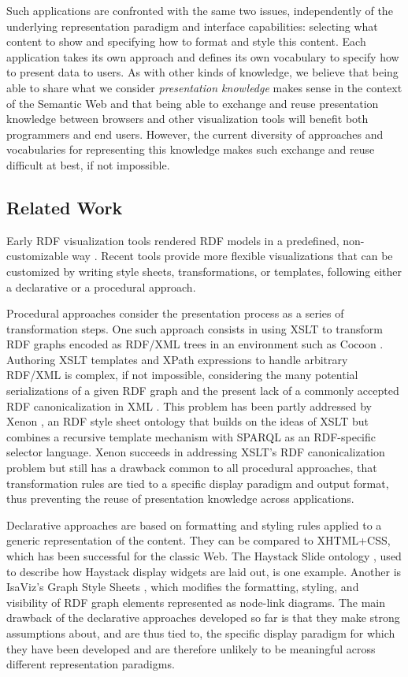 Such applications are confronted with the same two issues, independently of the underlying representation paradigm and interface capabilities: selecting what content to show and specifying how to format and style this content. Each application takes its own approach and defines its own vocabulary to specify how to present data to users. As with other kinds of knowledge, we believe that being able to share what we consider {\em presentation knowledge} makes sense in the context of the Semantic Web and that being able to exchange and reuse presentation knowledge between browsers and other visualization tools will benefit both programmers and end users. However, the current diversity of approaches and vocabularies for representing this knowledge makes such exchange and reuse difficult at best, if not impossible.

\subsection{Related Work}

Early RDF visualization tools rendered RDF models in a predefined, non-custo\-mizable way \cite{Steer03}. Recent tools provide more flexible visualizations that can be customized by writing style sheets, transformations, or templates, following either a declarative or a procedural approach.

Procedural approaches consider the presentation process as a series of transformation steps. One such approach consists in using XSLT to transform RDF graphs encoded as RDF/XML trees in an environment such as Cocoon \cite{cocoon05}. Authoring XSLT templates and XPath expressions to handle arbitrary RDF/XML is complex, if not impossible, considering the many potential serializations of a given RDF graph and the present lack of a commonly accepted RDF canonicalization in XML \cite{Carroll04}. This problem has been partly addressed by Xenon \cite{quan05}, an RDF style sheet ontology that builds on the ideas of XSLT but combines a recursive template mechanism with SPARQL as an RDF-specific selector language. Xenon succeeds in addressing XSLT's RDF canonicalization problem but still has a drawback common to all procedural approaches, that transformation rules are tied to a specific display paradigm and output format, thus preventing the reuse of presentation knowledge across applications.

Declarative approaches are based on formatting and styling rules applied to a generic representation of the content. They can be compared to XHTML+CSS, which has been successful for the classic Web. The Haystack Slide ontology \cite{HaystackUI03}, used to describe how Haystack display widgets are laid out, is one example. Another is IsaViz's Graph Style Sheets \cite{pietriga06b}, which modifies the formatting, styling, and visibility of RDF graph elements represented as node-link diagrams. The main drawback of the declarative approaches developed so far is that they make strong assumptions about, and are thus tied to, the specific display paradigm for which they have been developed and are therefore unlikely to be meaningful across different representation paradigms.

